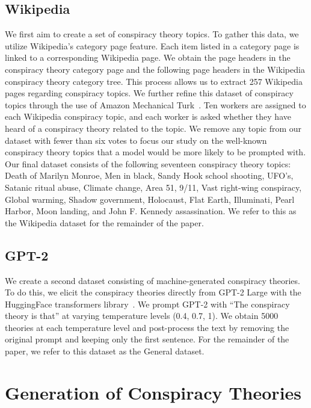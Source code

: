 \documentclass[11pt,a4paper]{article}
\begin{document}
\subsection{Wikipedia}
We first aim to create a set of conspiracy theory topics. To gather this data, we utilize Wikipedia's category page feature. Each item listed in a category page is linked to a corresponding Wikipedia page. We obtain the page headers in the conspiracy theory category page and the following page headers in the Wikipedia conspiracy theory category tree. This process allows us to extract 257 Wikipedia pages regarding conspiracy topics. We further refine this dataset of conspiracy topics through the use of Amazon Mechanical Turk~\cite{buhrmester2016amazon}. Ten workers are assigned to each Wikipedia conspiracy topic, and each worker is asked whether they have heard of a conspiracy theory related to the topic. We remove any topic from our dataset with fewer than six votes to focus our study on the well-known conspiracy theory topics that a model would be more likely to be prompted with. Our final dataset consists of the following seventeen conspiracy theory topics: Death of Marilyn Monroe, Men in black, Sandy Hook school shooting, UFO's, Satanic ritual abuse, Climate change, Area 51, 9/11, Vast right-wing conspiracy, Global warming, Shadow government, Holocaust, Flat Earth, Illuminati, Pearl Harbor, Moon landing, and John F. Kennedy assassination. We refer to this as the Wikipedia dataset for the remainder of the paper.

\subsection{GPT-2}
We create a second dataset consisting of machine-generated conspiracy theories. To do this, we elicit the conspiracy theories directly from GPT-2 Large with the HuggingFace transformers library~\cite{wolf-etal-2020-transformers}. We prompt GPT-2 with ``The conspiracy theory is that'' at varying temperature levels (0.4, 0.7, 1). We obtain 5000 theories at each temperature level and post-process the text by removing the original prompt and keeping only the first sentence. For the remainder of the paper, we refer to this dataset as the General dataset.




\section{Generation of Conspiracy Theories}\label{sec:context_gen}
\end{document}
